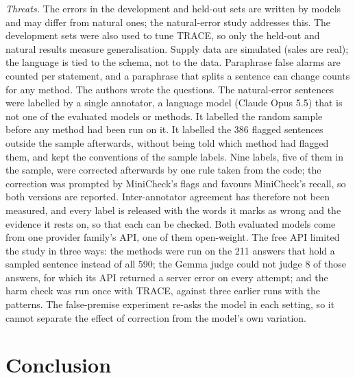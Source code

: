 \documentclass[journal]{IEEEtran}
\renewcommand{\paragraph}[1]{\par\textit{#1}\enspace}
\newcommand{\GEMMASCOPE}{could not judge 8 of those answers, for which its API returned a server error on every attempt}
\begin{document}
\paragraph{Threats.} The errors in the development and held-out sets are written by models and may differ
from natural ones; the natural-error study addresses this. The development sets were also used to tune
TRACE, so only the held-out and natural results measure generalisation. Supply data are simulated (sales
are real); the language is tied to the schema, not to the data. Paraphrase false alarms are counted per
statement, and a paraphrase that splits a sentence can change counts for any method. The authors wrote the
questions. The natural-error sentences were labelled by a single annotator, a language model (Claude Opus 5.5)
that is not one of the evaluated models or methods. It labelled the random sample before any method had been
run on it. It labelled the 386 flagged sentences outside the sample afterwards, without being told which
method had flagged them, and kept the conventions of the sample labels. Nine labels, five of them in the
sample, were corrected afterwards by one rule taken from the code; the correction was prompted by MiniCheck's
flags and favours MiniCheck's recall, so both versions are reported. Inter-annotator agreement has
therefore not been measured, and every label is released with the words
it marks as wrong and the evidence it rests on, so that each can be checked. Both evaluated models come from
one provider family's API, one of them open-weight. The free API limited the study in three ways: the
methods were run on the 211 answers that hold a sampled sentence instead of all 590; the Gemma judge \GEMMASCOPE;
and the harm check was run once with TRACE, against three earlier runs with the patterns. The false-premise experiment re-asks the model
in each setting, so it cannot separate the effect of correction from the model's own variation.

\section{Conclusion}
\end{document}
